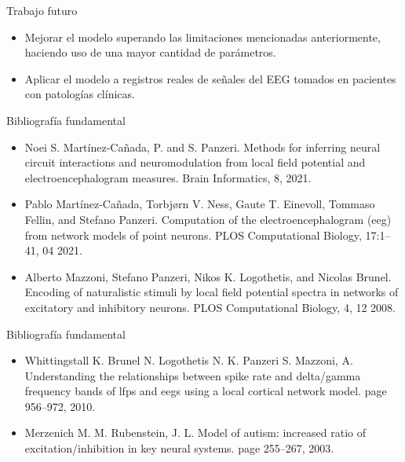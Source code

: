 \documentclass{beamer}
\begin{document}
\begin{frame}{Trabajo futuro}

\begin{itemize}
    \justifying
    \item Mejorar el modelo superando las limitaciones mencionadas anteriormente, haciendo uso de una mayor cantidad de parámetros.
    \vspace{4mm}    
    \pause
    \item Aplicar el modelo a registros reales de señales del EEG tomados en pacientes con patologías clínicas.
    
\end{itemize}
\end{frame}




\begin{frame}{Bibliografía fundamental}
\begin{itemize}
  \item Noei S. Martínez-Cañada, P. and S. Panzeri. Methods for inferring neural circuit interactions and neuromodulation from local field potential and electroencephalogram measures. Brain Informatics, 8, 2021. 
  \item Pablo Martínez-Cañada, Torbjørn V. Ness, Gaute T. Einevoll, Tommaso Fellin, and Stefano Panzeri. Computation of the electroencephalogram (eeg) from network models of point neurons. PLOS Computational Biology, 17:1–41, 04 2021.
  \item Alberto Mazzoni, Stefano Panzeri, Nikos K. Logothetis, and Nicolas Brunel. Encoding of naturalistic stimuli by local field potential spectra in networks of excitatory and inhibitory neurons. PLOS Computational Biology, 4, 12 2008. 
 
\end{itemize}

\end{frame}


\begin{frame}{Bibliografía fundamental}
\begin{itemize}
    \item Whittingstall K. Brunel N. Logothetis N. K. Panzeri S. Mazzoni, A. Understanding the relationships between spike rate and delta/gamma frequency bands of lfps and eegs using a local cortical network model. page 956–972, 2010.
    \item Merzenich M. M. Rubenstein, J. L. Model of autism: increased ratio of excitation/inhibition in key neural systems. page 255–267, 2003.  
\end{itemize}

\end{frame} 

 




    
\end{document}
